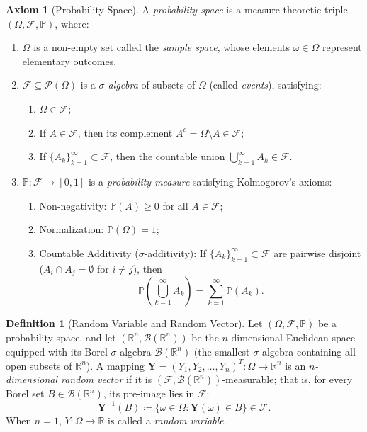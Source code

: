 \documentclass[11pt, letterpaper]{article}
\theoremstyle{definition}
\newtheorem{definition}{Definition}[section]
\newtheorem{axiom}{Axiom}[section]
\theoremstyle{remark}
\newcommand{\R}{\mathbb{R}}
\newcommand{\Prob}{\mathbb{P}}
\newcommand{\F}{\mathcal{F}}
\begin{document}
\begin{axiom}[Probability Space]
A \emph{probability space} is a measure-theoretic triple $(\Omega, \F, \Prob)$, where:
\begin{enumerate}[label=(\roman*)]
    \item $\Omega$ is a non-empty set called the \emph{sample space}, whose elements $\omega \in \Omega$ represent elementary outcomes.
    \item $\F \subseteq \mathcal{P}(\Omega)$ is a \emph{$\sigma$-algebra} of subsets of $\Omega$ (called \emph{events}), satisfying:
    \begin{enumerate}[label=(\alph*)]
        \item $\Omega \in \F$;
        \item If $A \in \F$, then its complement $A^c = \Omega \setminus A \in \F$;
        \item If $\{A_k\}_{k=1}^{\infty} \subset \F$, then the countable union $\bigcup_{k=1}^{\infty} A_k \in \F$.
    \end{enumerate}
    \item $\Prob : \F \to [0, 1]$ is a \emph{probability measure} satisfying Kolmogorov's axioms:
    \begin{enumerate}[label=(\alph*)]
        \item Non-negativity: $\Prob(A) \ge 0$ for all $A \in \F$;
        \item Normalization: $\Prob(\Omega) = 1$;
        \item Countable Additivity ($\sigma$-additivity): If $\{A_k\}_{k=1}^{\infty} \subset \F$ are pairwise disjoint ($A_i \cap A_j = \emptyset$ for $i \neq j$), then
        \[
            \Prob\left(\bigcup_{k=1}^{\infty} A_k\right) = \sum_{k=1}^{\infty} \Prob(A_k).
        \]
    \end{enumerate}
\end{enumerate}
\end{axiom}

\begin{definition}[Random Variable and Random Vector]
Let $(\Omega, \F, \Prob)$ be a probability space, and let $(\R^n, \mathcal{B}(\R^n))$ be the $n$-dimensional Euclidean space equipped with its Borel $\sigma$-algebra $\mathcal{B}(\R^n)$ (the smallest $\sigma$-algebra containing all open subsets of $\R^n$). A mapping $\mathbf{Y} = (Y_1, Y_2, \dots, Y_n)^T : \Omega \to \R^n$ is an \emph{$n$-dimensional random vector} if it is $(\F, \mathcal{B}(\R^n))$-measurable; that is, for every Borel set $B \in \mathcal{B}(\R^n)$, its pre-image lies in $\F$:
\[
    \mathbf{Y}^{-1}(B) \coloneqq \{\omega \in \Omega : \mathbf{Y}(\omega) \in B\} \in \F.
\]
When $n = 1$, $Y : \Omega \to \R$ is called a \emph{random variable}.
\end{definition}
\end{document}
